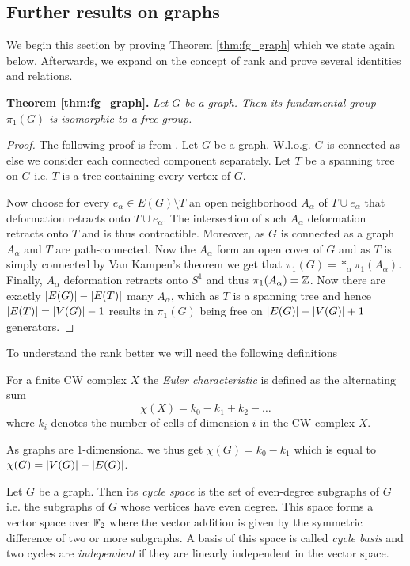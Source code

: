 \subsection{Further results on graphs}
\label{sec:RankGraph}
We begin this section by proving Theorem \ref{thm:fg_graph} which we state again below.
Afterwards, we expand on the concept of rank and prove several identities and relations.

\textbf{Theorem \ref{thm:fg_graph}.} \textit{Let $G$ be a graph. Then its fundamental group $\pi_{1}(G)$ is isomorphic to a free group.}

\begin{proof}
	The following proof is from \cite[p. 43f]{hatcher00}.
	Let $G$ be a graph. W.l.o.g. $G$ is connected as else we consider each connected component separately. 
	Let $T$ be a spanning tree on $G$ i.e. $T$ is a tree containing every vertex of $G$.

	Now choose for every $e_{\alpha} \in E(G) \setminus T$ an open neighborhood $A_{\alpha}$ of $T \cup e_{\alpha}$ that deformation retracts onto $T \cup e_{\alpha}$.
	The intersection of such $A_{\alpha}$ deformation retracts onto $T$ and is thus contractible. 
	Moreover, as $G$ is connected as a graph $A_{\alpha}$ and $T$ are path-connected.
	Now the $A_{\alpha}$ form an open cover of $G$ and as $T$ is simply connected by Van Kampen's theorem we get that $\pi_{1}(G) = *_{\alpha} \pi_{1}(A_{\alpha})$.
	Finally, $A_{\alpha}$ deformation retracts onto $S^{1}$ and thus $\pi_{1}(A_{\alpha}) = \mathbb{Z}$. Now there are exactly $\abs{E(G)} - \abs{E(T)}$ many $A_{\alpha}$,
	which as $T$ is a spanning tree and hence $\abs{E(T)} = \abs{V(G)}-1$ results in $\pi_1(G)$ being free on $\abs{E(G)} - \abs{V(G)} + 1$ generators.
\end{proof}

To understand the rank better we will need the following definitions
\begin{definition}
	For a finite CW complex $X$ the \emph{Euler characteristic} is defined as the alternating sum
	\[
		\chi(X) = k_0 - k_1 + k_2 - \ldots
	\] 
	where $k_{i}$ denotes the number of cells of dimension $i$ in the CW complex $X$.
\end{definition}
As graphs are $1$-dimensional we thus get $\chi (G) = k_0 - k_1$ which is equal to $\chi(G) = \abs{V(G)} - \abs{E(G)}$.

\begin{definition}
	Let $G$ be a graph. Then its \emph{cycle space} is the set of even-degree subgraphs of $G$ i.e. the subgraphs of $G$ whose vertices have even degree. 
	This space forms a vector space over $\mathbb{F}_2$ where the vector addition is given by the symmetric difference of two or more subgraphs.
	A basis of this space is called \emph{cycle basis} and two cycles are \emph{independent} if they are linearly independent in the vector space.
\end{definition}

